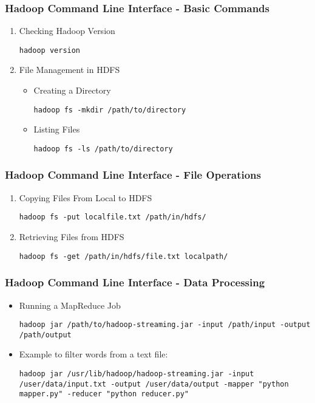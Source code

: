 \documentclass[aspectratio=169]{beamer}
\begin{document}
\begin{frame}[fragile]
    \frametitle{Hadoop Command Line Interface - Basic Commands}
    \begin{enumerate}
        \item Checking Hadoop Version
        \begin{lstlisting}
hadoop version
        \end{lstlisting}
        
        \item File Management in HDFS
        \begin{itemize}
            \item Creating a Directory
            \begin{lstlisting}
hadoop fs -mkdir /path/to/directory
            \end{lstlisting}
            \item Listing Files
            \begin{lstlisting}
hadoop fs -ls /path/to/directory
            \end{lstlisting}
        \end{itemize}
    \end{enumerate}
\end{frame}

\begin{frame}[fragile]
    \frametitle{Hadoop Command Line Interface - File Operations}
    \begin{enumerate}[resume]
        \item Copying Files From Local to HDFS
        \begin{lstlisting}
hadoop fs -put localfile.txt /path/in/hdfs/
        \end{lstlisting}
        
        \item Retrieving Files from HDFS
        \begin{lstlisting}
hadoop fs -get /path/in/hdfs/file.txt localpath/
        \end{lstlisting}
    \end{enumerate}
\end{frame}

\begin{frame}[fragile]
    \frametitle{Hadoop Command Line Interface - Data Processing}
    \begin{itemize}
        \item Running a MapReduce Job
        \begin{lstlisting}
hadoop jar /path/to/hadoop-streaming.jar -input /path/input -output /path/output
        \end{lstlisting}
        \item Example to filter words from a text file:
        \begin{lstlisting}
hadoop jar /usr/lib/hadoop/hadoop-streaming.jar -input /user/data/input.txt -output /user/data/output -mapper "python mapper.py" -reducer "python reducer.py"
        \end{lstlisting}
    \end{itemize}
\end{frame}
\end{document}
